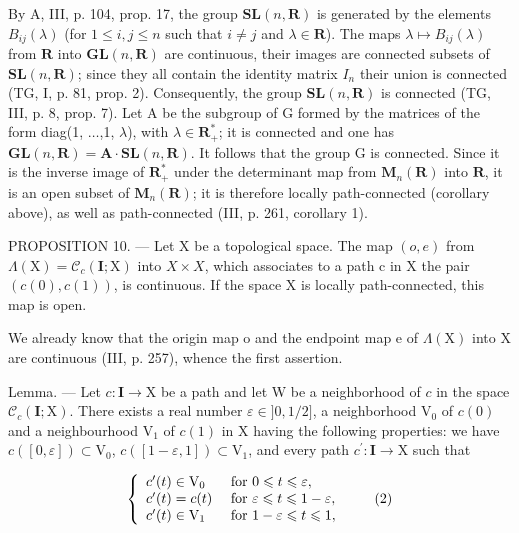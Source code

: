 By A, III, p. 104, prop. 17, the group \(\mathbf{SL}(n,\mathbf{R})\) is generated by the elements \(B_{ij}(\lambda)\) (for \(1\leqslant i,j\leqslant n\) such that \(i\neq j\) and \(\lambda\in\mathbf{R}\)). The maps \(\lambda\mapsto B_{ij}(\lambda)\) from \(\mathbf{R}\) into \(\mathbf{GL}(n,\mathbf{R})\) are continuous, their images are connected subsets of \(\mathbf{SL}(n,\mathbf{R})\); since they all contain the identity matrix \(I_n\) their union is connected (TG, I, p. 81, prop. 2). Consequently, the group \(\mathbf{SL}(n,\mathbf{R})\) is connected (TG, III, p. 8, prop. 7). Let A be the subgroup of G formed by the matrices of the form diag(1, \(\ldots\),1, \(\lambda\)), with \(\lambda\in\mathbf{R}_{+}^{*}\); it is connected and one has \(\mathbf{GL}(n,\mathbf{R})=\mathbf{A}\cdot\mathbf{SL}(n,\mathbf{R})\). It follows that the group G is connected. Since it is the inverse image of \(\mathbf{R}_{+}^{*}\) under the determinant map from \(\mathbf{M}_{n}(\mathbf{R})\) into \(\mathbf{R}\), it is an open subset of \(\mathbf{M}_{n}(\mathbf{R})\); it is therefore locally path-connected (corollary above), as well as path-connected (III, p. 261, corollary 1).

PROPOSITION 10. --- Let X be a topological space. The map \((o, e)\) from \(\Lambda(\mathrm{X}) = \mathcal{C}_{c}(\mathbf{I}; \mathrm{X})\) into \(X \times X\), which associates to a path c in X the pair \((c(0), c(1))\), is continuous. If the space X is locally path-connected, this map is open.

We already know that the origin map o and the endpoint map e of \(\Lambda(\mathrm{X})\) into X are continuous (III, p. 257), whence the first assertion.

Lemma. --- Let \(c\colon \mathbf{I}\to \mathrm{X}\) be a path and let W be a neighborhood of \(c\) in the space \(\mathcal{C}_c(\mathbf{I};\mathrm{X})\). There exists a real number \(\varepsilon \in ]0,1 / 2]\), a neighborhood \(\mathrm{V}_0\) of \(c(0)\) and a neighbourhood \(\mathrm{V}_1\) of \(c(1)\) in X having the following properties: we have \(c([0,\varepsilon])\subset \mathrm{V}_0\), \(c([1 - \varepsilon,1])\subset \mathrm{V}_1\), and every path \(c^{\prime}\colon \mathbf{I}\rightarrow \mathrm{X}\) such that

\[
\left\{ \begin{array}{l l} c ^ {\prime} (t) \in \mathrm{V} _ {0} & \text { for } 0 \leqslant t \leqslant \varepsilon , \\ c ^ {\prime} (t) = c (t) & \text { for } \varepsilon \leqslant t \leqslant 1 - \varepsilon , \\ c ^ {\prime} (t) \in \mathrm{V} _ {1} & \text { for } 1 - \varepsilon \leqslant t \leqslant 1, \end{array} \right.\tag{2}
\]

